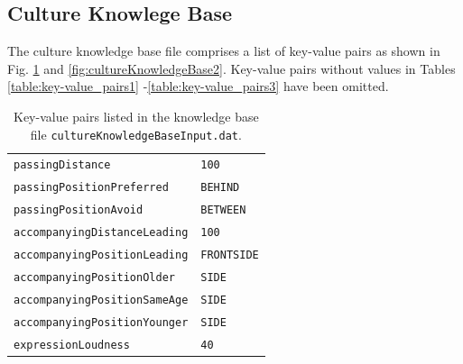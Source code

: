 \documentclass{CSSRforAfrica}
\begin{document}
\subsection{Culture Knowlege Base}
The culture knowledge base  file comprises a list of key-value pairs as shown in Fig. \ref{fig:cultureKnowledgeBase1} and \ref{fig:cultureKnowledgeBase2}.  Key-value pairs without values in Tables \ref{table:key-value_pairs1} -\ref{table:key-value_pairs3} have been omitted.  
 
\begin{table}[H]
\caption{Key-value pairs listed in the knowledge base file  {\tt \small cultureKnowledgeBaseInput.dat}.}
\label{fig:cultureKnowledgeBase1}
\vspace{-3mm}
\begin{tabular}{l l}
{\footnotesize \verb+passingDistance+} 	                                     & {\footnotesize \verb+100+} \vspace{-1.5mm} \\
{\footnotesize \verb+passingPositionPreferred+} 	                             & {\footnotesize \verb+BEHIND+ } \vspace{-1.5mm}\\
{\footnotesize \verb+passingPositionAvoid+}                                     & {\footnotesize \verb+BETWEEN+} \vspace{-1.5mm}\\ 
{\footnotesize \verb+accompanyingDistanceLeading+}                      & {\footnotesize \verb+100+} \vspace{-1.5mm} \\
{\footnotesize \verb+accompanyingPositionLeading+} 	                     & {\footnotesize \verb+FRONTSIDE+} \vspace{-1.5mm}\\
{\footnotesize \verb+accompanyingPositionOlder+} 	                     & {\footnotesize \verb+SIDE+} \vspace{-1.5mm}  \\
{\footnotesize \verb+accompanyingPositionSameAge+}                     & {\footnotesize \verb+SIDE+} \vspace{-1.5mm} \\
{\footnotesize \verb+accompanyingPositionYounger+}                      & {\footnotesize \verb+SIDE+}  \vspace{-1.5mm} \\
{\footnotesize \verb+expressionLoudness+}                                      & {\footnotesize \verb+40+ } \vspace{-1.5mm} \\

\end{tabular}
\end{table}
\end{document}

